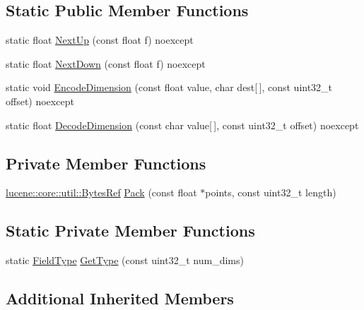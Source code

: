 \subsection*{Static Public Member Functions}
\begin{DoxyCompactItemize}
\item 
static float \mbox{\hyperlink{classlucene_1_1core_1_1document_1_1FloatPoint_ab6b6b86250786703f7a46e7028cd6dfd}{Next\+Up}} (const float f) noexcept
\item 
static float \mbox{\hyperlink{classlucene_1_1core_1_1document_1_1FloatPoint_a0cac69cd699b0645a195b2ae58eaf5d0}{Next\+Down}} (const float f) noexcept
\item 
static void \mbox{\hyperlink{classlucene_1_1core_1_1document_1_1FloatPoint_ab8494f2f0e931bec1fdf34dec7954db9}{Encode\+Dimension}} (const float value, char dest\mbox{[}$\,$\mbox{]}, const uint32\+\_\+t offset) noexcept
\item 
static float \mbox{\hyperlink{classlucene_1_1core_1_1document_1_1FloatPoint_adda5c047a340264e4d10e8a47fe513ba}{Decode\+Dimension}} (const char value\mbox{[}$\,$\mbox{]}, const uint32\+\_\+t offset) noexcept
\end{DoxyCompactItemize}
\subsection*{Private Member Functions}
\begin{DoxyCompactItemize}
\item 
\mbox{\hyperlink{classlucene_1_1core_1_1util_1_1BytesRef}{lucene\+::core\+::util\+::\+Bytes\+Ref}} \mbox{\hyperlink{classlucene_1_1core_1_1document_1_1FloatPoint_ad3370170ead68941120b8f8c7af1aaa2}{Pack}} (const float $\ast$points, const uint32\+\_\+t length)
\end{DoxyCompactItemize}
\subsection*{Static Private Member Functions}
\begin{DoxyCompactItemize}
\item 
static \mbox{\hyperlink{classlucene_1_1core_1_1document_1_1FieldType}{Field\+Type}} \mbox{\hyperlink{classlucene_1_1core_1_1document_1_1FloatPoint_a6f95b1c279cf34c497e0eaa2d7a19fdc}{Get\+Type}} (const uint32\+\_\+t num\+\_\+dims)
\end{DoxyCompactItemize}
\subsection*{Additional Inherited Members}


